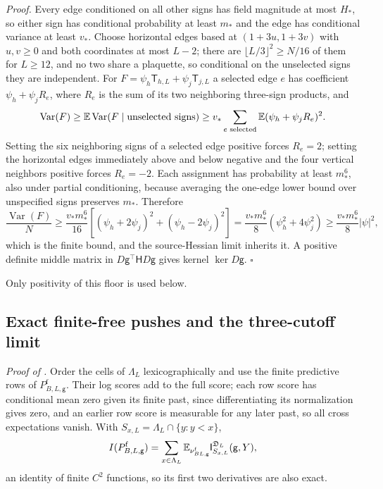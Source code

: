 \noindent\emph{Proof.}
Every edge conditioned on all other signs has field magnitude at most $H_*$,
so either sign has conditional probability at least $m_*$ and the edge has
conditional variance at least $v_*$. Choose horizontal edges based at
$(1+3u,1+3v)$ with $u,v\ge0$ and both coordinates at most $L-2$; there are
$\lfloor L/3\rfloor^2\ge N/16$ of them for $L\ge12$, and no two share a
plaquette, so conditional on the unselected signs they are independent. For
$F=\psi_h\mathsf T_{h,L}+\psi_j\mathsf T_{j,L}$ a selected edge $e$ has
coefficient $\psi_h+\psi_jR_e$, where $R_e$ is the sum of its two neighboring
three-sign products, and
\begin{equation}
 \operatorname{Var}(F)\ge
 \mathbb E\operatorname{Var}(F\mid\text{unselected signs})
 \ge v_*\sum_{e\text{ selected}}\mathbb E(\psi_h+\psi_jR_e)^2.
 \label{eq:rg-thermo-native-separated-variance}
\end{equation}
Setting the six neighboring signs of a selected edge positive forces
$R_e=2$; setting the horizontal edges immediately above and below negative
and the four vertical neighbors positive forces $R_e=-2$. Each assignment has
probability at least $m_*^6$, also under partial conditioning, because
averaging the one-edge lower bound over unspecified signs preserves $m_*$.
Therefore
\begin{equation}
 \frac{\operatorname{Var}(F)}N
 \ge\frac{v_*m_*^6}{16}
            [(\psi_h+2\psi_j)^2+(\psi_h-2\psi_j)^2]
 =\frac{v_*m_*^6}{8}(\psi_h^2+4\psi_j^2)
 \ge\frac{v_*m_*^6}{8}|\psi|^2,
 \label{eq:rg-thermo-native-directional-floor}
\end{equation}
which is the finite bound, and the source-Hessian limit inherits it. A
positive definite middle matrix in $D\mathsf g^\top\mathsf HD\mathsf g$ gives kernel
$\ker D\mathsf g$. $\square$

Only positivity of this floor is used below.

\subsection{Exact finite-free pushes and the three-cutoff limit}
\label{sec:rg-thermo-native-free-push}

\noindent\emph{Proof of .}
Order the cells of $\Lambda_L$ lexicographically and use the finite
predictive rows of $P^{\mathrm f}_{B,L,\mathsf g}$. Their log scores add to the
full score; each row score has conditional mean zero given its finite past,
since differentiating its normalization gives zero, and an earlier row score
is measurable for any later past, so all cross expectations vanish. With
$S_{x,L}=\Lambda_L\cap\{y:y<x\}$,
\begin{equation}
 I(P^{\mathrm f}_{B,L,\mathsf g})=
    \sum_{x\in\Lambda_L}\mathbb E_{\nu^{\mathrm f}_{BL,\mathsf g}}
                              \mathsf I^{\mathfrak D_L}_{S_{x,L}}(\mathsf g,Y),
 \label{eq:rg-thermo-native-finite-score-rows}
\end{equation}
an identity of finite $C^2$ functions, so its first two derivatives are also
exact.

